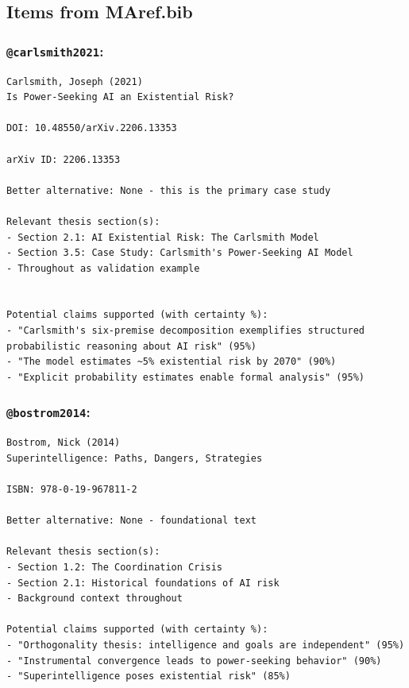 \documentclass[
  11pt,
  letterpaper,
]{book}
\begin{document}
\subsection{Items from MAref.bib}\label{items-from-maref.bib-1}

\subsubsection{\texorpdfstring{\texttt{@carlsmith2021}:
\textcite{carlsmith2021}}{@carlsmith2021: @carlsmith2021}}\label{carlsmith2021-carlsmith2021-1}

\begin{verbatim}
Carlsmith, Joseph (2021)
Is Power-Seeking AI an Existential Risk?

DOI: 10.48550/arXiv.2206.13353

arXiv ID: 2206.13353

Better alternative: None - this is the primary case study

Relevant thesis section(s): 
- Section 2.1: AI Existential Risk: The Carlsmith Model
- Section 3.5: Case Study: Carlsmith's Power-Seeking AI Model
- Throughout as validation example


Potential claims supported (with certainty %):
- "Carlsmith's six-premise decomposition exemplifies structured probabilistic reasoning about AI risk" (95%)
- "The model estimates ~5% existential risk by 2070" (90%)
- "Explicit probability estimates enable formal analysis" (95%)
\end{verbatim}

\subsubsection{\texorpdfstring{\texttt{@bostrom2014}:
\textcite{bostrom2014}}{@bostrom2014: @bostrom2014}}\label{bostrom2014-bostrom2014-1}

\begin{verbatim}
Bostrom, Nick (2014)
Superintelligence: Paths, Dangers, Strategies

ISBN: 978-0-19-967811-2

Better alternative: None - foundational text

Relevant thesis section(s):
- Section 1.2: The Coordination Crisis
- Section 2.1: Historical foundations of AI risk
- Background context throughout

Potential claims supported (with certainty %):
- "Orthogonality thesis: intelligence and goals are independent" (95%)
- "Instrumental convergence leads to power-seeking behavior" (90%)
- "Superintelligence poses existential risk" (85%)
\end{verbatim}
\end{document}
